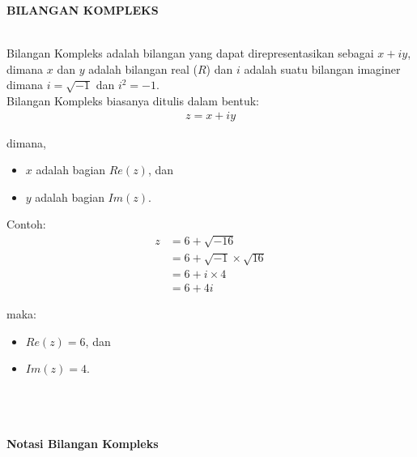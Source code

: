 \documentclass{article}
\begin{document}
\begin{center}
    \textbf{BILANGAN KOMPLEKS}
\end{center}
\leavevmode\\

Bilangan Kompleks adalah bilangan yang dapat direpresentasikan sebagai \( x + iy \), dimana $x$ dan $y$ adalah bilangan real ($R$) dan $i$ adalah suatu bilangan imaginer dimana \( i = \sqrt{-1} \) dan \( i^2 = -1 \).\\

Bilangan Kompleks biasanya ditulis dalam bentuk:
\begin{align}
    \boxed{z = x + iy}\nonumber
\end{align}

\>dimana,
\begin{itemize}
    \item $x$ adalah bagian $Re(z)$, dan
    \item $y$ adalah bagian $Im(z)$. \\
\end{itemize}

Contoh:
\begin{align}
    z & = 6 + \sqrt{-16}
    \nonumber                            \\
      & = 6 + \sqrt{-1} \times \sqrt{16}
    \nonumber                            \\
      & = 6 + i \times 4
    \nonumber                            \\
      & = 6 + 4i
    \nonumber
\end{align}

maka:
\begin{itemize}
    \item $Re(z) = 6$, dan
    \item $Im(z) = 4$. \\ \\ \\ \\
\end{itemize}



\newpage
\begin{center}
    \textbf{Notasi Bilangan Kompleks}
\end{center}
\leavevmode\\

\\ \\
\end{document}
